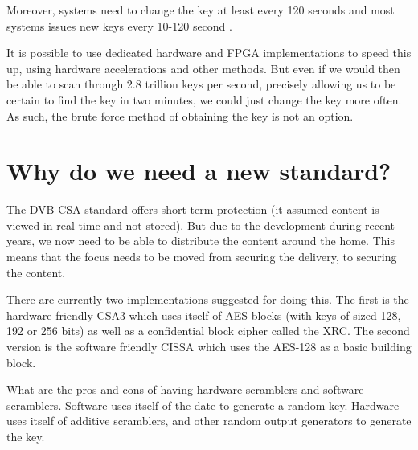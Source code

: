 Moreover, systems need to change the key at least every 120 seconds \citep{Simpson:2009} and most systems issues new keys every 10-120 second \citep{Wirt:2004}.

It is possible to use dedicated hardware and FPGA implementations to speed this 
up, using hardware accelerations and other methods. But even if we would then 
be able to scan through 2.8 trillion keys per second, precisely allowing us to 
be certain to find the key in two minutes, we could just change the key more 
often. As such, the brute force method of obtaining the key is not an option.



\section{Why do we need a new standard?}
The DVB-CSA standard offers short-term protection (it assumed content is viewed 
in real time and not stored). But due to the development during recent years, 
we now need to be able to distribute the content around the home. This means 
that the focus needs to be moved from securing the delivery, to securing the 
content. \citep{Farncombe}


There are currently two implementations suggested for doing this. The first is 
the hardware friendly CSA3 which uses itself of AES blocks (with keys of sized 
128, 192 or 256 bits) as well as a confidential block cipher called the XRC. The 
second version is the software friendly CISSA which uses the AES-128 as a basic 
building block. \citep{DVB:2013}

What are the pros and cons of having hardware scramblers and software scramblers.
Software uses itself of the date to generate a random key. Hardware uses itself 
of additive scramblers, and other random output generators to generate the key. 
